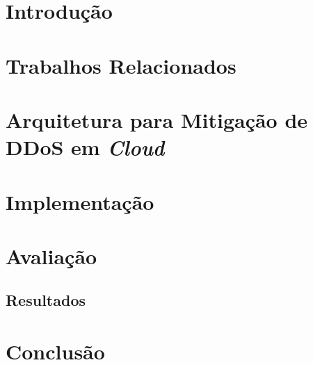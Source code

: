 \documentclass[a4paper, 12pt]{article}
\begin{document}

\section{Introdução}



\section{Trabalhos Relacionados}


\section{Arquitetura para Mitigação de DDoS em \emph{Cloud}}



\section{Implementação}


\section{Avaliação}




\subsection{Resultados}


\section{Conclusão}



%

%


% 

{\footnotesize


}
\end{document}
